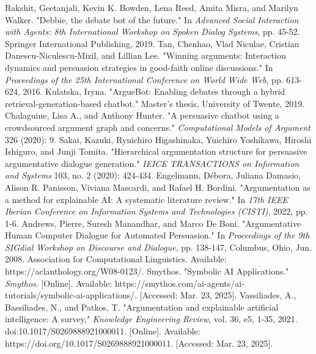 \documentclass[conference]{IEEEtran}
\begin{document}
\begin{thebibliography}{00}
 Rakshit, Geetanjali, Kevin K. Bowden, Lena Reed, Amita Misra, and Marilyn Walker. "Debbie, the debate bot of the future." In \textit{Advanced Social Interaction with Agents: 8th International Workshop on Spoken Dialog Systems}, pp. 45-52. Springer International Publishing, 2019.
 Tan, Chenhao, Vlad Niculae, Cristian Danescu-Niculescu-Mizil, and Lillian Lee. "Winning arguments: Interaction dynamics and persuasion strategies in good-faith online discussions." In \textit{Proceedings of the 25th International Conference on World Wide Web}, pp. 613-624, 2016.
 Kulatska, Iryna. "ArgueBot: Enabling debates through a hybrid retrieval-generation-based chatbot." Master's thesis, University of Twente, 2019.
 Chalaguine, Lisa A., and Anthony Hunter. "A persuasive chatbot using a crowdsourced argument graph and concerns." \textit{Computational Models of Argument} 326 (2020): 9.
 Sakai, Kazuki, Ryuichiro Higashinaka, Yuichiro Yoshikawa, Hiroshi Ishiguro, and Junji Tomita. "Hierarchical argumentation structure for persuasive argumentative dialogue generation." \textit{IEICE TRANSACTIONS on Information and Systems} 103, no. 2 (2020): 424-434.
 Engelmann, Débora, Juliana Damasio, Alison R. Panisson, Viviana Mascardi, and Rafael H. Bordini. "Argumentation as a method for explainable AI: A systematic literature review." In \textit{17th IEEE Iberian Conference on Information Systems and Technologies (CISTI)}, 2022, pp. 1-6.
 Andrews, Pierre, Suresh Manandhar, and Marco De Boni. "Argumentative Human Computer Dialogue for Automated Persuasion." In \textit{Proceedings of the 9th SIGdial Workshop on Discourse and Dialogue}, pp. 138-147, Columbus, Ohio, Jun. 2008. Association for Computational Linguistics. Available: https://aclanthology.org/W08-0123/.
 Smythos. "Symbolic AI Applications." \textit{Smythos}. [Online]. Available: https://smythos.com/ai-agents/ai-tutorials/symbolic-ai-applications/. [Accessed: Mar. 23, 2025].
 Vassiliades, A., Bassiliades, N., and Patkos, T. "Argumentation and explainable artificial intelligence: A survey," \textit{Knowledge Engineering Review}, vol. 36, e5, 1-35, 2021. doi:10.1017/S0269888921000011. [Online]. Available: https://doi.org/10.1017/S0269888921000011. [Accessed: Mar. 23, 2025].

\end{thebibliography}
\end{document}
